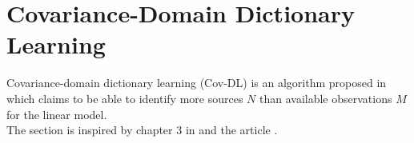 \section{Covariance-Domain Dictionary Learning}\label{sec:Cov-DL}
Covariance-domain dictionary learning (Cov-DL) is an algorithm proposed in \cite{Balkan2015} which claims to be able to identify more sources $N$ than available observations $M$ for the linear model.
\\
The section is inspired by chapter 3 in \cite{phd2015} and the article \cite{Balkan2015}.
\\ \\
